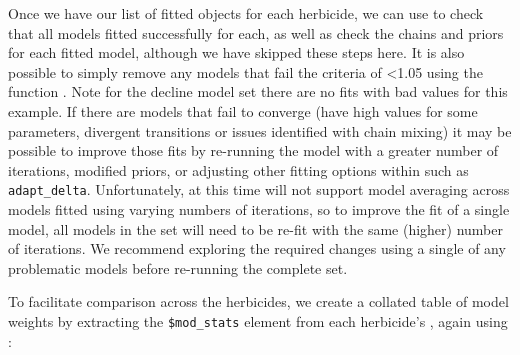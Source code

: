 \documentclass[
  shortnames]{jss}
\begin{document}
Once we have our list of fitted  objects for each herbicide, we can use  to check that all models fitted successfully for each, as well as check the chains and priors for each fitted model, although we have skipped these steps here. It is also possible to simply remove any models that fail the  criteria of \textless1.05 using the function . Note for the decline model set there are no fits with bad  values for this example. If there are models that fail to converge (have high  values for some parameters, divergent transitions or issues identified with chain mixing) it may be possible to improve those fits by re-running the model with a greater number of iterations, modified priors, or adjusting other fitting options within  such as \texttt{adapt\_delta}. Unfortunately, at this time  will not support model averaging across models fitted using varying numbers of iterations, so to improve the fit of a single model, all models in the set will need to be re-fit with the same (higher) number of iterations. We recommend exploring the required changes using a single  of any problematic models before re-running the complete  set.

\begin{CodeChunk}
\end{CodeChunk}

To facilitate comparison across the herbicides, we create a collated table of model weights by extracting the \texttt{\$mod\_stats} element from each herbicide's , again using :

\begin{CodeChunk}
\end{CodeChunk}
\end{document}
